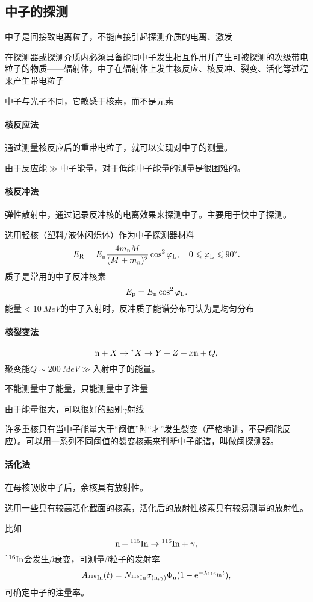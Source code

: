 \subsection{中子的探测}
中子是间接致电离粒子，不能直接引起探测介质的电离、激发

在探测器或探测介质内必须具备能同中子发生相互作用并产生可被探测的次级带电粒子的物质——辐射体，中子在辐射体上发生核反应、核反冲、裂变、活化等过程来产生带电粒子

中子与光子不同，它敏感于核素，而不是元素
\paragraph{核反应法}通过测量核反应后的重带电粒子，就可以实现对中子的测量。

由于反应能$\gg$中子能量，对于低能中子能量的测量是很困难的。
\paragraph{核反冲法}弹性散射中，通过记录反冲核的电离效果来探测中子。主要用于快中子探测。

选用轻核（塑料/液体闪烁体）作为中子探测器材料
\[
	E_{\mathrm{R}}=E_\mathrm n\frac{4m_\mathrm n M}{(M+m_\mathrm n)^2}\cos^2\varphi_{\mathrm L},\quad 0\leqslant\varphi_{\mathrm L}\leqslant 90^\circ.
\]
质子是常用的中子反冲核素
\[
	E_\mathrm p=E_\mathrm n\cos^2\varphi_{\mathrm L}.
\]
能量$<\SI{10}{MeV}$的中子入射时，反冲质子能谱分布可认为是均匀分布
\paragraph{核裂变法}
\[
	\mathrm n+X\to{}^\ast X\to Y+Z+x\mathrm n+Q,
\]
聚变能$Q\sim\SI{200}{MeV}\gg$入射中子的能量。
\begin{compactitem}
	\item 不能测量中子能量，只能测量中子注量
	\item 由于能量很大，可以很好的甄别$\gamma$射线
\end{compactitem}
许多重核只有当中子能量大于“阈值”时“才”发生裂变（严格地讲，不是阈能反应）。可以用一系列不同阈值的裂变核素来判断中子能谱，叫做阈探测器。
\paragraph{活化法}
在母核吸收中子后，余核具有放射性。

选用一些具有较高活化截面的核素，活化后的放射性核素具有较易测量的放射性。

比如
\[
	\mathrm n+{^{115}\mathrm{In}}\to{^{116}\mathrm{In}}+\gamma,
\]
${^{116}\mathrm{In}}$会发生$\beta$衰变，可测量$\beta$粒子的发射率
\[
	A_{{^{116}\mathrm{In}}}(t)=N_{{^{115}\mathrm{In}}}\sigma_{(\mathrm n,\gamma)}\Phi_\mathrm n(1-\mathop{}\!\mathrm{e}^{-\lambda_{{^{116}\mathrm{In}}}t}),
\]
可确定中子的注量率。
